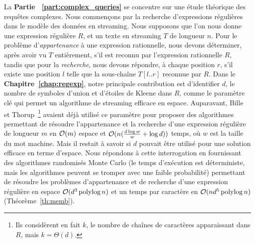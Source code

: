 La \textbf{Partie ~\ref{part:complex_queries}} se concentre sur une étude théorique des requêtes complexes.
Nous commençons par la recherche d'expressions régulières dans le modèle des données en streaming.
%
Nous supposons que l'on nous donne une expression régulière $R$, et un texte en streaming $T$ de longueur $n$. Pour le problème d'\emph{appartenance} à une expression rationnelle, nous devons déterminer, après avoir vu $T$ entièrement, s'il est reconnu par l'expression rationnelle $R$, tandis que pour la \emph{recherche}, nous devons répondre, à chaque position $r$, s'il existe une position $l$ telle que la sous-chaîne $T[l..r]$ reconnue par $R$.
Dans le \textbf{Chapitre~\ref{chap:regexp}}, notre principale contribution est d'identifier $d$, le nombre de symboles d'union et d'étoiles de Kleene dans $R$, comme le paramètre clé qui permet un algorithme de streaming efficace en espace. 
Auparavant, Bille et Thorup~\cite{doi:10.1137/1.9781611973075.104}\footnote{Ils considèrent en fait $k$, le nombre de chaînes de caractères apparaissant dans $R$, mais $k=\Theta(d)$. } avaient déjà utilisé ce paramètre pour proposer des algorithmes permettant de résoudre l'appartenance et la recherche d'une expression régulière de longueur $m$ en $\mathcal{O}(m)$ espace et $\mathcal{O}(n(\frac{d\log w}{w} + \log d))$ temps, où $w$ est la taille du mot machine. Mais il restait à savoir si $d$ pouvait être utilisé pour une solution efficace en terme d'espace.
%
Nous répondons à cette interrogation en fournissant des algorithmes randomisés Monte Carlo (le temps d'exécution est déterministe, mais les algorithmes peuvent se tromper avec une faible probabilité) permettant de résoudre les problèmes d'appartenance et de recherche d'une expression régulière en espace $\mathcal{O}(d^3\operatorname{polylog} n)$ et un temps par caractère en $\mathcal{O}(nd^5\operatorname{polylog} n)$ (Théorème~\ref{th:memb}).

